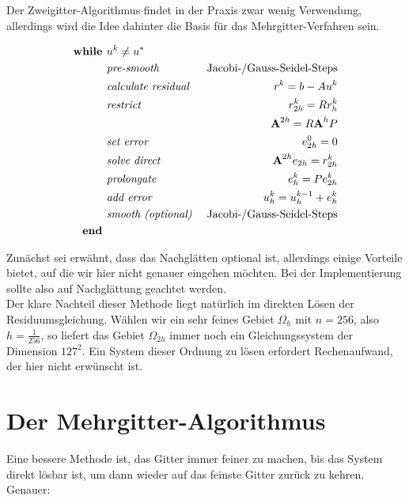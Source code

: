 Der Zweigitter-Algorithmus findet in der Praxis zwar wenig Verwendung, allerdings wird die Idee dahinter die Basis für das Mehrgitter-Verfahren sein.

\begin{eqnarray}
\textbf{while }                                 &u^{k} \ne u^{*} \notag \\
&\textit{pre-smooth }                         &\textnormal{Jacobi-/Gauss-Seidel-Steps} \notag \\
&\textit{calculate residual }        &r^{k} = b - Au^{k} \notag \\
&\textit{restrict }                         &r^{k}_{2h}=Rr^{k}_{h} \notag \\
&                                                                &{\textbf{A}}^{2h} = R{\textbf{A}}^{h}P \notag \\
&\textit{set error }                        &e^{0}_{2h} = 0 \notag \\
&\textit{solve direct }                        &{\textbf{A}}^{2h} e_{2h} = r^{k}_{2h} \notag \\
&\textit{prolongate }                        &e^{k}_{h} = Pe^{k}_{2h} \notag \\
&\textit{add error }                        &u^{k}_{h} = u^{k-1}_{h} + e^{k}_{h} \notag \\
&\textit{smooth (optional) }        &\textnormal{Jacobi-/Gauss-Seidel-Steps} \notag \\
\textbf{end } \notag
\end{eqnarray}

Zunächst sei erwähnt, dass das Nachglätten optional ist, allerdings einige Vorteile bietet, auf die wir hier nicht genauer eingehen möchten. Bei der Implementierung sollte also auf Nachglättung geachtet werden. \\
Der klare Nachteil dieser Methode liegt natürlich im direkten Lösen der Residuumsgleichung. Wählen wir ein sehr feines Gebiet $\Omega_{h}$ mit $n = 256$, also $h = \frac {1} {256}$, so liefert das Gebiet $\Omega_{2h}$ immer noch ein Gleichungssystem der Dimension $127^{2}$. Ein System dieser Ordnung zu lösen erfordert Rechenaufwand, der hier nicht erwünscht ist. \\

\section{Der Mehrgitter-Algorithmus}\label{s.Mehrgitteralgorithmus}

Eine bessere Methode ist, das Gitter immer feiner zu machen, bis das System direkt lösbar ist, um dann wieder auf das feinste Gitter zurück zu kehren. Genauer:

